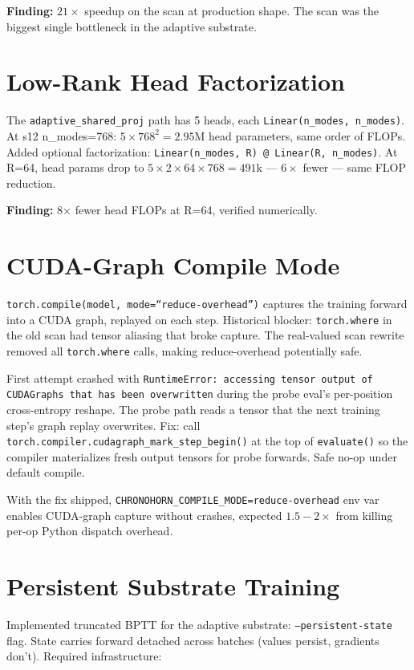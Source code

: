 \documentclass[11pt,a4paper]{report}
\newcommand{\finding}[1]{\textcolor{finding}{\textbf{Finding:}} #1}
\begin{document}
\finding{$21\times$ speedup on the scan at production shape. The scan was the biggest single bottleneck in the adaptive substrate.}

\section{Low-Rank Head Factorization}

The \texttt{adaptive\_shared\_proj} path has 5 heads, each \texttt{Linear(n\_modes, n\_modes)}. At s12 n\_modes=768: $5 \times 768^2 = 2.95$M head parameters, same order of FLOPs. Added optional factorization: \texttt{Linear(n\_modes, R) @ Linear(R, n\_modes)}. At R=64, head params drop to $5 \times 2 \times 64 \times 768 = 491$k --- $6\times$ fewer --- same FLOP reduction.

\finding{8$\times$ fewer head FLOPs at R=64, verified numerically.}

\section{CUDA-Graph Compile Mode}

\texttt{torch.compile(model, mode=``reduce-overhead'')} captures the training forward into a CUDA graph, replayed on each step. Historical blocker: \texttt{torch.where} in the old scan had tensor aliasing that broke capture. The real-valued scan rewrite removed all \texttt{torch.where} calls, making reduce-overhead potentially safe.

First attempt crashed with \texttt{RuntimeError: accessing tensor output of CUDAGraphs that has been overwritten} during the probe eval's per-position cross-entropy reshape. The probe path reads a tensor that the next training step's graph replay overwrites. Fix: call \texttt{torch.compiler.cudagraph\_mark\_step\_begin()} at the top of \texttt{evaluate()} so the compiler materializes fresh output tensors for probe forwards. Safe no-op under default compile.

With the fix shipped, \texttt{CHRONOHORN\_COMPILE\_MODE=reduce-overhead} env var enables CUDA-graph capture without crashes, expected $1.5-2\times$ from killing per-op Python dispatch overhead.

\section{Persistent Substrate Training}

Implemented truncated BPTT for the adaptive substrate: \texttt{--persistent-state} flag. State carries forward detached across batches (values persist, gradients don't). Required infrastructure:
\end{document}
